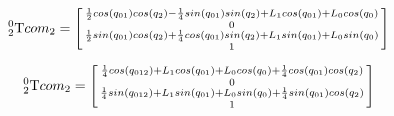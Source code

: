 \documentclass{article}
\begin{document}
\begin{equation}  
_{2}^{0}\textrm{T}com_{2} = \begin{bsmallmatrix}
 \frac{1}{2}cos(q_{01})cos(q_{2}) - \frac{1}{4}sin(q_{01})sin(q_{2}) + L_{1}cos(q_{01})+L_{0}cos(q_{0}) \\ 
 0 \\ 
 \frac{1}{2}sin(q_{01})cos(q_{2}) + \frac{1}{4}cos(q_{01})sin(q_{2}) + L_{1}sin(q_{01})+L_{0}sin(q_{0})\\ 
 1
\end{bsmallmatrix}
\end{equation}

\begin{equation}  
_{2}^{0}\textrm{T}com_{2} = \begin{bsmallmatrix}
 \frac{1}{4}cos(q_{012}) + L_{1}cos(q_{01})+L_{0}cos(q_{0}) + \frac{1}{4}cos(q_{01})cos(q_{2}) \\ 
 0 \\ 
 \frac{1}{4}sin(q_{012}) + L_{1}sin(q_{01})+L_{0}sin(q_{0}) + \frac{1}{4}sin(q_{01})cos(q_{2})\\ 
 1
\end{bsmallmatrix}
\end{equation}
\end{document}
